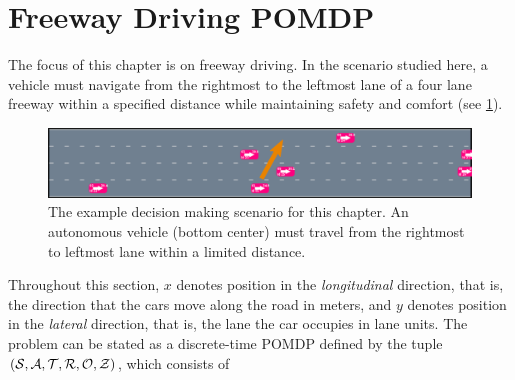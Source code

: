 
\section{Freeway Driving POMDP} \label{sec:multilanepomdp}

The focus of this chapter is on freeway driving.
In the scenario studied here, a vehicle must navigate from the rightmost to the leftmost lane of a four lane freeway within a specified distance while maintaining safety and comfort (see \cref{fig:scene}).

\begin{figure}[tb]
    \centering
    \includegraphics[width=\columnwidth]{media/scene.png}
    \caption[Lane changing scenario]{The example decision making scenario for this chapter. An autonomous vehicle (bottom center) must travel from the rightmost to leftmost lane within a limited distance.}
    \label{fig:scene}
\end{figure}

Throughout this section, $x$ denotes position in the \emph{longitudinal} direction, that is, the direction that the cars move along the road in meters, and $y$ denotes position in the \emph{lateral} direction, that is, the lane the car occupies in lane units.
The problem can be stated as a discrete-time POMDP defined by the tuple $(\mathcal{S}, \mathcal{A}, \mathcal{T}, \mathcal{R}, \mathcal{O}, \mathcal{Z})$, which consists of

